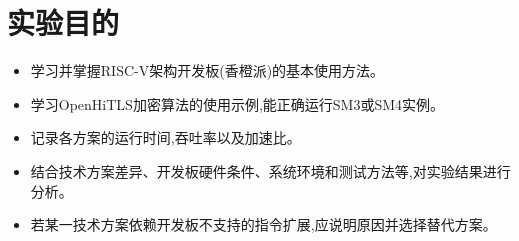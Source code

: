 \section{实验目的}
\begin{itemize}
    \item [1.]学习并掌握RISC-V架构开发板(香橙派)的基本使用方法。
    \item [2.]学习OpenHiTLS加密算法的使用示例,能正确运行SM3或SM4实例。
    \item [3.]记录各方案的运行时间,吞吐率以及加速比。
    \item [4.]结合技术方案差异、开发板硬件条件、系统环境和测试方法等,对实验结果进行分析。
    \item [5.]若某一技术方案依赖开发板不支持的指令扩展,应说明原因并选择替代方案。
\end{itemize}

